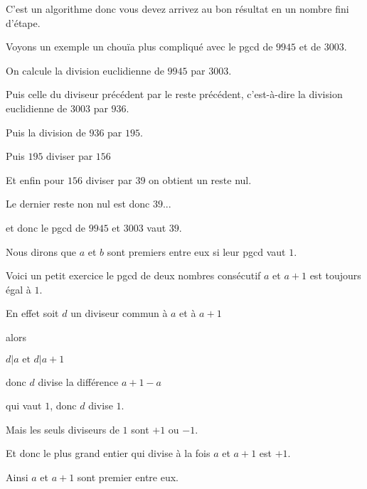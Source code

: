 C'est un algorithme donc vous devez arrivez au bon résultat en un nombre fini d'étape.

Voyons un exemple un chouïa plus compliqué
avec le pgcd de $9945$ et de $3003$.

\change

On calcule la division euclidienne de $9945$ par $3003$.

\change

Puis celle du diviseur précédent par le reste précédent, 
c'est-à-dire la division euclidienne de
 $3003$ par $936$.

\change

Puis la division de $936$ par $195$.

\change


Puis $195$ diviser par $156$

\change

Et enfin pour $156$ diviser par $39$ on obtient un reste nul.

\change

Le dernier reste non nul est donc $39$...

\change

et donc  le pgcd de $9945$ et  $3003$ vaut $39$.


\diapo

Nous dirons que $a$ et $b$ sont premiers entre eux si leur pgcd vaut $1$.

\change

Voici un petit exercice le pgcd de deux nombres consécutif $a$ et $a+1$ est toujours
égal à $1$.

\change

En effet soit $d$ un diviseur commun à $a$ et à $a+1$

\change

alors 

$d|a \text{ et } d|a+1$

\change

donc $d$ divise la différence $a+1-a$

\change

qui vaut $1$, donc $d$ divise $1$.

\change

Mais les seuls diviseurs de $1$ sont $+1$ ou $-1$.


\change

Et donc le plus grand entier qui divise à la fois $a$ et $a+1$ est $+1$.

Ainsi $a$ et $a+1$ sont premier entre eux.


